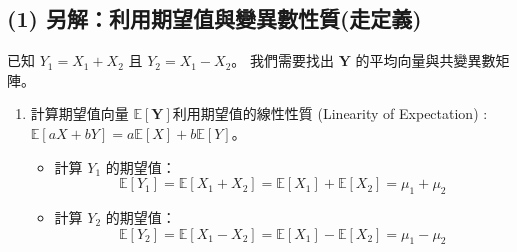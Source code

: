 \documentclass{article}
\begin{document}
\subsection*{(1) 另解：利用期望值與變異數性質(走定義)}
已知 $Y_1 = X_1 + X_2$ 且 $Y_2 = X_1 - X_2$。
我們需要找出 $\bm Y$ 的平均向量與共變異數矩陣。
\begin{enumerate}
    \item 計算期望值向量 $\mathbb{E}[\bm Y]$利用期望值的線性性質 (Linearity of Expectation) :\\
    $\mathbb{E}[aX + bY] = a\mathbb{E}[X] + b\mathbb{E}[Y]$。
    \begin{itemize}
        \item 計算 $Y_1$ 的期望值：
        $$\mathbb{E}[Y_1] = \mathbb{E}[X_1 + X_2] = 
        \mathbb{E}[X_1] + \mathbb{E}[X_2] = \mu_1 + \mu_2$$
        \item 計算 $Y_2$ 的期望值：
        $$\mathbb{E}[Y_2] = \mathbb{E}[X_1 - X_2] = \mathbb{E}[X_1] - \mathbb{E}[X_2] = 
        \mu_1 - \mu_2$$
        

\end{itemize}
\end{enumerate}
\end{document}
